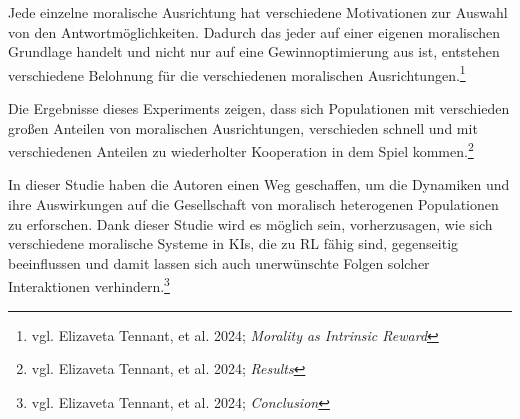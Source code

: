 Jede einzelne moralische Ausrichtung hat verschiedene Motivationen zur Auswahl von den Antwortmöglichkeiten.
Dadurch das jeder auf einer eigenen moralischen Grundlage handelt und nicht nur auf eine Gewinnoptimierung aus ist,
entstehen verschiedene Belohnung für die verschiedenen moralischen Ausrichtungen.\footnote{vgl. Elizaveta Tennant, et al. 2024; \textit{Morality as Intrinsic Reward}}

Die Ergebnisse dieses Experiments zeigen, dass sich Populationen mit verschieden großen Anteilen von moralischen Ausrichtungen,
verschieden schnell und mit verschiedenen Anteilen zu wiederholter Kooperation in dem Spiel kommen.\footnote{vgl. Elizaveta Tennant, et al. 2024; \textit{Results}}

In dieser Studie haben die Autoren einen Weg geschaffen, um die Dynamiken und ihre Auswirkungen auf die Gesellschaft von moralisch heterogenen Populationen
zu erforschen.
Dank dieser Studie wird es möglich sein, vorherzusagen, wie sich verschiedene moralische Systeme in KIs, die zu RL fähig sind, gegenseitig
beeinflussen und damit lassen sich auch unerwünschte Folgen solcher Interaktionen verhindern.\footnote{vgl. Elizaveta Tennant, et al. 2024; \textit{Conclusion}}

